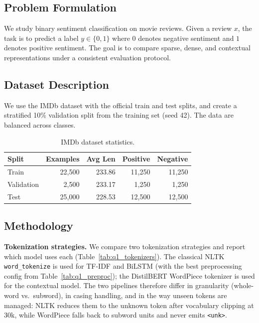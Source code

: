 
\subsection{Problem Formulation}
We study binary sentiment classification on movie reviews. Given a review $x$, the task is to predict a label $y \in \{0,1\}$ where $0$ denotes negative sentiment and $1$ denotes positive sentiment. The goal is to compare sparse, dense, and contextual representations under a consistent evaluation protocol.

\subsection{Dataset Description}
We use the IMDb dataset \citep{Maas2011imdb} with the official train and test splits, and create a stratified 10\% validation split from the training set (seed 42). The data are balanced across classes.

\begin{table}[H]
\centering
\caption{IMDb dataset statistics.}
\begin{tabular}{lrrrr}
\toprule
\textbf{Split} & \textbf{Examples} & \textbf{Avg Len} & \textbf{Positive} & \textbf{Negative} \\
\midrule
Train & 22,500 & 233.86 & 11,250 & 11,250 \\
Validation & 2,500 & 233.17 & 1,250 & 1,250 \\
Test & 25,000 & 228.53 & 12,500 & 12,500 \\
\bottomrule
\end{tabular}
\end{table}

\subsection{Methodology}
\textbf{Tokenization strategies.} We compare two tokenization strategies and report which model uses each (Table~\ref{tab:q1_tokenizers}). The classical NLTK \texttt{word\_tokenize} is used for TF-IDF and BiLSTM (with the best preprocessing config from Table~\ref{tab:q1_preproc}); the DistilBERT WordPiece tokenizer is used for the contextual model. The two pipelines therefore differ in granularity (whole-word vs.\ subword), in casing handling, and in the way unseen tokens are managed: NLTK reduces them to the unknown token after vocabulary clipping at 30k, while WordPiece falls back to subword units and never emits \texttt{<unk>}.

